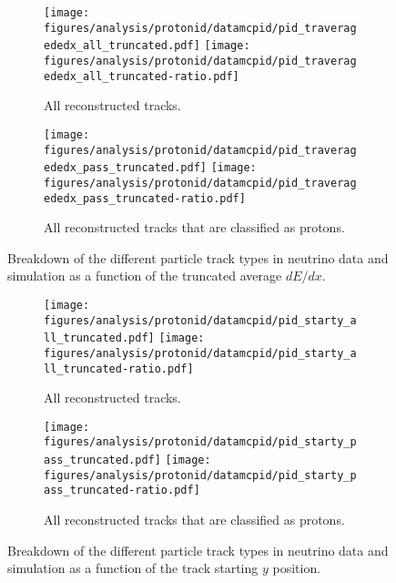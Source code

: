     \begin{figure}[h]
      \centering
      \begin{subfigure}[t]{2.8in}
        \texttt{[image: figures/analysis/protonid/datamcpid/pid\_traveragededx\_all\_truncated.pdf]}
        \texttt{[image: figures/analysis/protonid/datamcpid/pid\_traveragededx\_all\_truncated-ratio.pdf]}
        \caption{All reconstructed tracks.}
      \end{subfigure}
      \hspace{2pt}
      \begin{subfigure}[t]{2.8in}
        \texttt{[image: figures/analysis/protonid/datamcpid/pid\_traveragededx\_pass\_truncated.pdf]}
        \texttt{[image: figures/analysis/protonid/datamcpid/pid\_traveragededx\_pass\_truncated-ratio.pdf]}
        \caption{All reconstructed tracks that are classified as protons.}
      \end{subfigure}
      \caption{Breakdown of the different particle track types in neutrino data
      and simulation as a function of the truncated average $dE/dx$.}
      \label{fig:pidtraveragededx}
    \end{figure}
    \begin{figure}[h]
      \centering
      \begin{subfigure}[t]{2.8in}
        \texttt{[image: figures/analysis/protonid/datamcpid/pid\_starty\_all\_truncated.pdf]}
        \texttt{[image: figures/analysis/protonid/datamcpid/pid\_starty\_all\_truncated-ratio.pdf]}
        \caption{All reconstructed tracks.}
      \end{subfigure}
      \hspace{2pt}
      \begin{subfigure}[t]{2.8in}
        \texttt{[image: figures/analysis/protonid/datamcpid/pid\_starty\_pass\_truncated.pdf]}
        \texttt{[image: figures/analysis/protonid/datamcpid/pid\_starty\_pass\_truncated-ratio.pdf]}
        \caption{All reconstructed tracks that are classified as protons.}
      \end{subfigure}
      \caption{Breakdown of the different particle track types in neutrino data
      and simulation as a function of the track starting $y$ position.}
      \label{fig:pidstarty}
    \end{figure}
